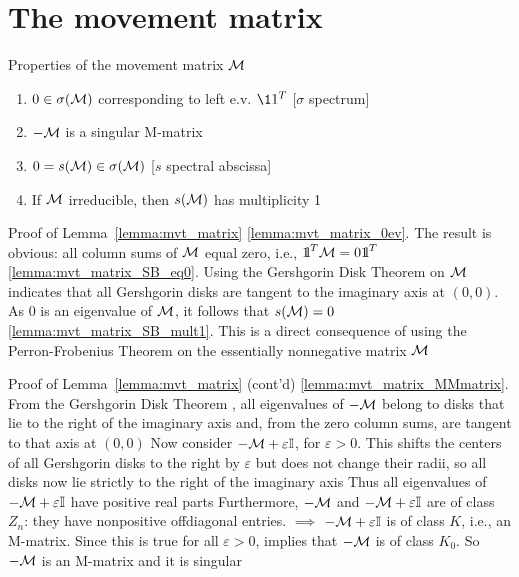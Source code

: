 \documentclass[aspectratio=169]{beamer}
\begin{document}
\section{The movement matrix}
\begin{frame}{Properties of the movement matrix $\mathcal{M}$}
	\begin{lemma}\label{lemma:mvt_matrix}
		\begin{enumerate}
			\item $0\in\sigma(\mathcal{M})$ corresponding to left e.v. $\11^T$ \hfill[$\sigma$ spectrum] \label{lemma:mvt_matrix_0ev}
			\item $-\mathcal{M}$ is a singular M-matrix \label{lemma:mvt_matrix_MMmatrix}
			\item $0=s(\mathcal{M})\in\sigma(\mathcal{M})$ \hfill[$s$ spectral abscissa] \label{lemma:mvt_matrix_SB_eq0}
			\item If $\mathcal{M}$ irreducible, then $s(\mathcal{M})$ has multiplicity 1 \label{lemma:mvt_matrix_SB_mult1}
		\end{enumerate}
	\end{lemma}
\end{frame}



\begin{frame}{Proof of Lemma~\ref{lemma:mvt_matrix}}
\ref{lemma:mvt_matrix_0ev}. The result is obvious: all column sums of $\mathcal{M}$ equal zero, i.e., $\nbOne^T\M=0\nbOne^T$
\vfill
\noindent\ref{lemma:mvt_matrix_SB_eq0}. Using the Gershgorin Disk Theorem \cite{Varga2010} on $\mathcal{M}$ indicates that all Gershgorin disks are tangent to the imaginary axis at $(0,0)$. As 0 is an eigenvalue of $\mathcal{M}$, it follows that $s(\mathcal{M})=0$
\vfill
\noindent\ref{lemma:mvt_matrix_SB_mult1}. This is a direct consequence of using the Perron-Frobenius Theorem on the essentially nonnegative matrix $\mathcal{M}$
\end{frame}

\begin{frame}{Proof of Lemma~\ref{lemma:mvt_matrix} (cont'd)}
	\noindent\ref{lemma:mvt_matrix_MMmatrix}. 
	From the Gershgorin Disk Theorem \cite{Varga2010}, all eigenvalues of $-\mathcal{M}$ belong to disks that lie to the right of the imaginary axis and, from the zero column sums, are tangent to that axis at $(0,0)$
	\vfill
	Now consider $-\mathcal{M}+\varepsilon\mathbb{I}$, for $\varepsilon>0$. 
	This shifts the centers of all Gershgorin disks to the right by $\varepsilon$ \cite[Problem 1.2.P8]{HornJohnson2013} but does not change their radii, so all disks now lie strictly to the right of the imaginary axis 
	\vfill
	Thus all eigenvalues of $-\mathcal{M}+\varepsilon\mathbb{I}$ have positive real parts
	\vfill
	Furthermore, $-\mathcal{M}$ and $-\mathcal{M}+\varepsilon\mathbb{I}$ are of class $Z_n$: they have nonpositive offdiagonal entries. 
	\cite[Theorem 5.1.1(18)]{Fiedler2008} $\implies$ $-\mathcal{M}+\varepsilon\mathbb{I}$ is of class $K$, i.e., an M-matrix.
	Since this is true for all $\varepsilon>0$, \cite[Theorem 5.2.1(1)]{Fiedler2008} implies that $-\mathcal{M}$ is of class $K_0$. 
	So $-\mathcal{M}$ is an M-matrix and it is singular
\end{frame}
\end{document}
